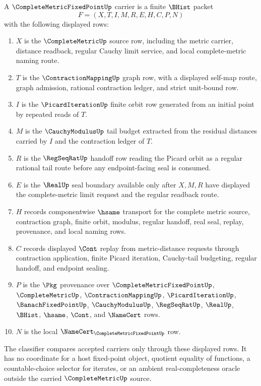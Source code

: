 \begin{definition}
\label{def:complete-metric-fixed-point-carrier}
A $\CompleteMetricFixedPointUp$ carrier is a finite $\BHist$ packet
$$
F=(X,T,I,M,R,E,H,C,P,N)
$$
with the following displayed rows:
\begin{enumerate}
\item $X$ is the $\CompleteMetricUp$ source row, including the metric carrier, distance readback, regular Cauchy limit service, and local complete-metric naming route.
\item $T$ is the $\ContractionMappingUp$ graph row, with a displayed self-map route, graph admission, rational contraction ledger, and strict unit-bound row.
\item $I$ is the $\PicardIterationUp$ finite orbit row generated from an initial point by repeated reads of $T$.
\item $M$ is the $\CauchyModulusUp$ tail budget extracted from the residual distances carried by $I$ and the contraction ledger of $T$.
\item $R$ is the $\RegSeqRatUp$ handoff row reading the Picard orbit as a regular rational tail route before any endpoint-facing seal is consumed.
\item $E$ is the $\RealUp$ seal boundary available only after $X,M,R$ have displayed the complete-metric limit request and the regular readback route.
\item $H$ records componentwise $\hsame$ transport for the complete metric source, contraction graph, finite orbit, modulus, regular handoff, real seal, replay, provenance, and local naming rows.
\item $C$ records displayed $\Cont$ replay from metric-distance requests through contraction application, finite Picard iteration, Cauchy-tail budgeting, regular handoff, and endpoint sealing.
\item $P$ is the $\Pkg$ provenance over $\CompleteMetricFixedPointUp$, $\CompleteMetricUp$, $\ContractionMappingUp$, $\PicardIterationUp$, $\BanachFixedPointUp$, $\CauchyModulusUp$, $\RegSeqRatUp$, $\RealUp$, $\BHist$, $\hsame$, $\Cont$, and $\NameCert$ rows.
\item $N$ is the local $\NameCert_{\CompleteMetricFixedPointUp}$ row.
\end{enumerate}
The classifier compares accepted carriers only through these displayed rows. It has no coordinate for a host fixed-point object, quotient equality of functions, a countable-choice selector for iterates, or an ambient real-completeness oracle outside the carried $\CompleteMetricUp$ source.
\end{definition}

